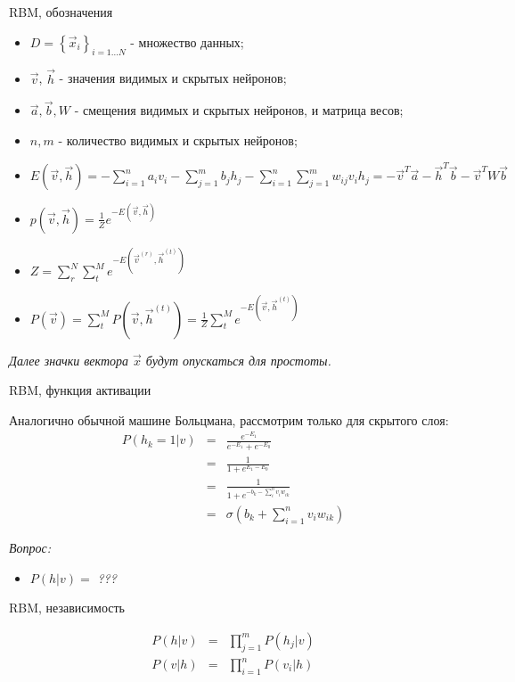 \documentclass[10pt]{beamer}
\begin{document}
\begin{frame}{RBM, обозначения}

\begin{itemize}
	\item $D = \left\{ \vec x_i \right\}_{i=1\ldots N}$ - множество данных;
	\item $\vec v$, $\vec h$ - значения видимых и скрытых нейронов;
	\item $\vec a, \vec b, W$ - смещения видимых и скрытых нейронов, и матрица весов;
	\item $n, m$ - количество видимых и скрытых нейронов;
	\item $E(\vec v, \vec h) = -\sum_{i=1}^n a_i v_i - \sum_{j=1}^m b_j h_j - \sum_{i=1}^n \sum_{j=1}^m w_{ij} v_i h_j = -\vec v^T \vec a - \vec h^T \vec b - \vec v^T W \vec b$
	\item $p(\vec v, \vec h) = \frac{1}{Z} e^{-E(\vec v, \vec h)}$
	\item $Z = \sum_r^N \sum_t^M e^{-E(\vec v^{(r)}, \vec h^{(t)})}$
	\item $P(\vec v) = \sum_t^M P(\vec v, \vec h^{(t)}) = \frac{1}{Z} \sum_t^M e^{-E(\vec v, \vec h^{(t)})}$
\end{itemize}
\textit{Далее значки вектора $\vec x$ будут опускаться для простоты.}

\end{frame}


\begin{frame}{RBM, функция активации}

Аналогично обычной машине Больцмана, рассмотрим только для скрытого слоя:
\begin{eqnarray*}
P(h_k = 1 | v) &=& \frac{e^{-E_1}}{e^{-E_1} + e^{-E_0}} \\
&=& \frac{1}{1 + e^{E_1 - E_0}} \\
&=& \frac{1}{1 + e^{-b_k - \sum_i^n v_i w_{ik}}}\\
&=& \sigma\left( b_k + \sum_{i=1}^n v_i w_{ik} \right)
\end{eqnarray*}

\textit{Вопрос:}
\begin{itemize}
	\item $P(h | v) = $ \textit{???}
\end{itemize}

\end{frame}


\begin{frame}{RBM, независимость}

\begin{eqnarray*}
P(h | v) &=& \prod_{j = 1}^m P(h_j | v) \\
P(v | h) &=& \prod_{i = 1}^n P(v_i | h)
\end{eqnarray*}

\end{frame}
\end{document}
